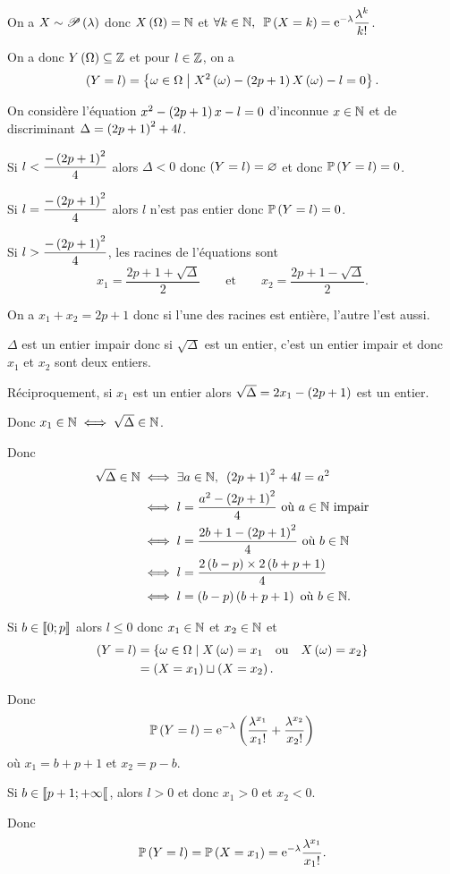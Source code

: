 \begin{corr}
On a \(X\sim\mathscr{P}\left(\lambda\right)\) donc \(X\left(\Omega\right)=\mathbb{N}\) et \(\quantifs{\forall k\in\N}\proba{X=k}=\e{-\lambda}\dfrac{\lambda^k}{k!}\).

On a donc \(Y\left(\Omega\right)\subseteq\mathbb{Z}\) et pour \(l\in\mathbb{Z}\), on a \[\left(Y=l\right)=\left\lbrace\omega\in\Omega\;\middle|\; X^2\left(\omega\right)-\left(2p+1\right)X\left(\omega\right)-l=0\right\rbrace.\]

On considère l'équation \(x^2-\left(2p+1\right)x-l=0\) d'inconnue \(x\in\mathbb{N}\) et de discriminant \(\Delta=\left(2p+1\right)^2+4l\).

Si \(l<\dfrac{-\left(2p+1\right)^2}{4}\) alors \(\Delta<0\) donc \(\left(Y=l\right)=\varnothing\) et donc \(\mathbb{P}\left(Y=l\right)=0\).

Si \(l=\dfrac{-\left(2p+1\right)^2}{4}\) alors \(l\) n'est pas entier donc \(\mathbb{P}\left(Y=l\right)=0\).

Si \(l>\dfrac{-\left(2p+1\right)^2}{4}\), les racines de l'équations sont \[x_1=\dfrac{2p+1+\sqrt{\Delta}}{2}\qquad\text{et}\qquad x_2=\dfrac{2p+1-\sqrt{\Delta}}{2}.\]

On a \(x_1+x_2=2p+1\) donc si l'une des racines est entière, l'autre l'est aussi.

\(\Delta\) est un entier impair donc si \(\sqrt{\Delta}\) est un entier, c'est un entier impair et donc \(x_1\) et \(x_2\) sont deux entiers.

Réciproquement, si \(x_1\) est un entier alors \(\sqrt{\Delta}=2x_1-\left(2p+1\right)\) est un entier.

Donc \(x_1\in\mathbb{N}\iff\sqrt{\Delta}\in\mathbb{N}\).

Donc \[\begin{aligned}
\sqrt{\Delta}\in\N&\ssi\quantifs{\exists a\in\N}\paren{2p+1}^2+4l=a^2 \\
&\ssi l=\dfrac{a^2-\paren{2p+1}^2}{4}\text{ où }a\in\N\text{ impair} \\
&\ssi l=\dfrac{2b+1-\paren{2p+1}^2}{4}\text{ où }b\in\N \\
&\ssi l=\dfrac{2\paren{b-p}\times 2\paren{b+p+1}}{4} \\
&\ssi l=\paren{b-p}\paren{b+p+1}\text{ où }b\in\N.
\end{aligned}\]

Si \(b\in\left\llbracket0;p\right\rrbracket\) alors \(l\leq0\) donc \(x_1\in\mathbb{N}\) et \(x_2\in\mathbb{N}\) et \[\begin{aligned}
\left(Y=l\right)&=\left\lbrace\omega\in\Omega\;\middle|\; X\left(\omega\right)=x_1\quad\text{ou}\quad X\left(\omega\right)=x_2\right\rbrace \\
&=\left(X=x_1\right)\sqcup\left(X=x_2\right).
\end{aligned}\]

Donc \[\mathbb{P}\left(Y=l\right)=\mathrm{e}^{-\lambda}\left(\dfrac{\lambda^{x_1}}{x_1!}+\dfrac{\lambda^{x_2}}{x_2!}\right)\] où \(x_1=b+p+1\) et \(x_2=p-b\).

Si \(b\in\left\llbracket p+1;+\infty\right\llbracket\), alors \(l>0\) et donc \(x_1>0\) et \(x_2<0\).

Donc \[\mathbb{P}\left(Y=l\right)=\mathbb{P}\left(X=x_1\right)=\mathrm{e}^{-\lambda}\dfrac{\lambda^{x_1}}{x_1!}.\]
\end{corr}

